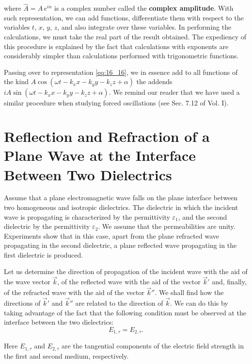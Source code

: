 \noindent
where $\hat{A} = A\,e^{i\alpha}$ is a complex number called the \textbf{complex amplitude}.
With such representation, we can add functions, differentiate them with respect to the variables $t$, $x$, $y$, $z$, and also integrate over these
variables.
In performing the calculations, we must take the real part of the result obtained.
The expediency of this procedure is explained by the fact that calculations with exponents are considerably simpler than calculations performed with trigonometric functions.

Passing over to representation \eqref{eq:16_16}, we in essence add to all functions of the kind $A \cos(\omega t - k_x x - k_y y - k_z z + \alpha)$ the addends $iA \sin(\omega t - k_x x - k_y y - k_z z + \alpha)$.
We remind our reader that we have used a similar procedure when studying forced oscillations (see Sec. 7.12 of Vol. I).

\section{Reflection and Refraction of a Plane Wave at the Interface Between Two Dielectrics}\label{sec:16_3}

Assume that a plane electromagnetic wave falls on the plane interface between two homogeneous and isotropic dielectrics.
The dielectric in which the incident wave is propagating is characterized by the permittivity $\varepsilon_1$, and the second dielectric by the permittivity $\varepsilon_2$.
We assume that the permeabilities are unity. Experiments show that in this case, apart from the plane refracted wave propagating in the second dielectric, a plane reflected wave propagating in the first dielectric is produced.

Let us determine the direction of propagation of the incident wave with the aid of the wave vector $\vec{k}$, of the reflected wave with the aid of the vector $\vec{k}'$ and, finally, of the refracted wave with the aid of the vector $\vec{k}''$.
We shall find how the directions of $\vec{k}'$ and $\vec{k}''$ are related to the direction of $\vec{k}$.
We can do this by taking advantage of the fact that the following condition must be observed at the interface between the two dielectrics:
\begin{equation}\label{eq:16_17}
    E_{1,\tau} = E_{2,\tau}.
\end{equation}

\noindent
Here $E_{1,\tau}$ and $E_{2,\tau}$ are the tangential components of the electric field strength in the first and second medium, respectively.

